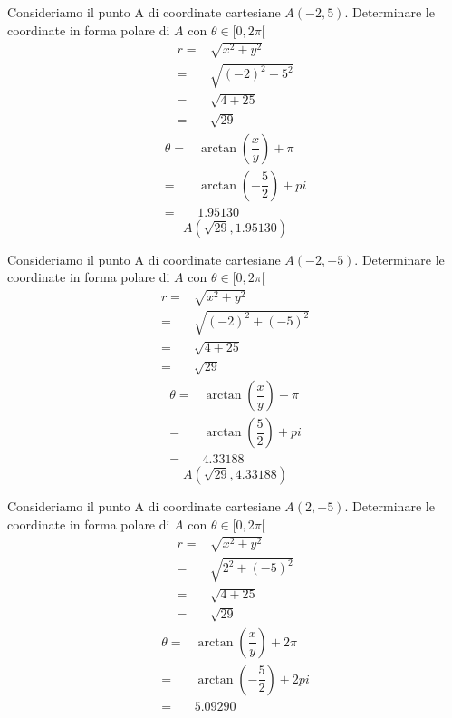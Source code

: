 \begin{esempiot}{}{} Consideriamo il punto A di coordinate cartesiane $A(-2,5)$. Determinare le coordinate in forma polare di $A$ con $\theta\in[0,2\pi[$
	\begin{align*}
	r=&\sqrt{x^2+y^2}\\
	=&\sqrt{(-2)^2+5^2}\\
	=&\sqrt{4+25}\\
	=&\sqrt{29}
	\end{align*}
	\begin{align*}
	\theta=&\arctan\left(\dfrac{x}{y}\right)+\pi\\
	=&\arctan\left(-\dfrac{5}{2}\right)+pi\\
	=&1.95130
	\end{align*}
	\[A(\sqrt{29},1.95130) \]
\end{esempiot}
\begin{esempiot}{}{} Consideriamo il punto A di coordinate cartesiane $A(-2,-5)$. Determinare le coordinate in forma polare di $A$ con $\theta\in[0,2\pi[$
	\begin{align*}
	r=&\sqrt{x^2+y^2}\\
	=&\sqrt{(-2)^2+(-5)^2}\\
	=&\sqrt{4+25}\\
	=&\sqrt{29}
	\end{align*}
	\begin{align*}
	\theta=&\arctan\left(\dfrac{x}{y}\right)+\pi\\
	=&\arctan\left(\dfrac{5}{2}\right)+pi\\
	=&4.33188
	\end{align*}
\[A(\sqrt{29},4.33188) \]
\end{esempiot}
\begin{esempiot}{}{} Consideriamo il punto A di coordinate cartesiane $A(2,-5)$. Determinare le coordinate in forma polare di $A$ con $\theta\in[0,2\pi[$
	\begin{align*}
	r=&\sqrt{x^2+y^2}\\
	=&\sqrt{2^2+(-5)^2}\\
	=&\sqrt{4+25}\\
	=&\sqrt{29}
	\end{align*}
	\begin{align*}
	\theta=&\arctan\left(\dfrac{x}{y}\right)+2\pi\\
	=&\arctan\left(-\dfrac{5}{2}\right)+2pi\\
	=&5.09290
	\end{align*}
\end{esempiot}

